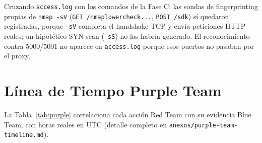 \documentclass[journal]{IEEEtran}
\begin{document}
Cruzando \texttt{access.log} con los comandos de la Fase C: las sondas de
fingerprinting propias de \texttt{nmap -sV} (\texttt{GET
/nmaplowercheck...}, \texttt{POST /sdk}) sí quedaron registradas, porque
\texttt{-sV} completa el handshake TCP y envía peticiones HTTP reales; un
hipotético SYN scan (\texttt{-sS}) no las habría generado. El reconocimiento
contra 5000/5001 no aparece en \texttt{access.log} porque esos puertos no
pasaban por el proxy.

\section{Línea de Tiempo Purple Team}
\label{sec:purpleteam}

La Tabla~\ref{tab:purple} correlaciona cada acción Red Team con su evidencia
Blue Team, con horas reales en UTC (detalle completo en
\texttt{anexos/purple-team-timeline.md}).
\end{document}
